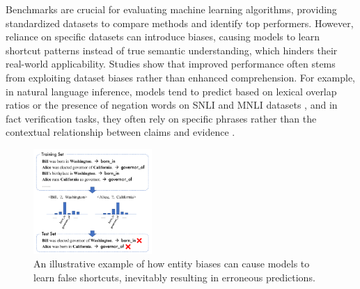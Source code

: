 \documentclass[letterpaper]{article} %
\begin{document}

Benchmarks are crucial for evaluating machine learning algorithms, providing standardized datasets to compare methods and identify top performers. However, reliance on specific datasets can introduce biases, causing models to learn shortcut patterns instead of true semantic understanding, which hinders their real-world applicability. Studies show that improved performance often stems from exploiting dataset biases rather than enhanced comprehension. For example, in natural language inference, models tend to predict based on lexical overlap ratios or the presence of negation words on SNLI \cite{bowman2015large} and MNLI \cite{williams2018broad} datasets \cite{gururangan2018annotation,mccoy2019right}, and in fact verification tasks, they often rely on specific phrases rather than the contextual relationship between claims and evidence \cite{schuster2019towards}.

\begin{figure}[htbp]
    \centering
    \includegraphics[width=0.4\textwidth]{figure/entity_bias_example.pdf}
    \caption{An illustrative example of how entity biases can cause models to learn false shortcuts, inevitably resulting in erroneous predictions.}
    \label{fig:entity-bias-example}
\end{figure}
\end{document}
